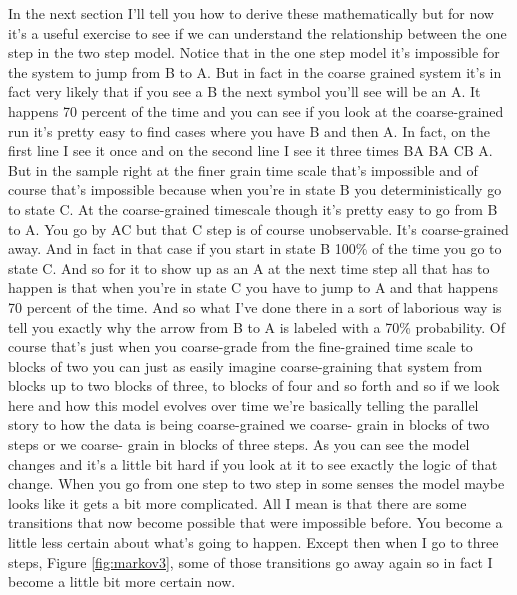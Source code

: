 \documentclass[]{article}
\begin{document}
 In the
next section I'll tell you how to derive
these mathematically but for now it's a
useful exercise to see if we can
understand the relationship between the
one step in the two step model.
Notice that in the one step model it's
impossible for the system to jump from B
to A. But in fact in the coarse grained
system it's in fact very likely that if
you see a B the next symbol you'll see
will be an A. It happens 70 percent of
the time and you can see if you look at
the coarse-grained run it's pretty easy to
find cases where you have B and then A.
In fact, on the first line I see it once
and on the second line I see it three
times BA BA CB A. But in the sample right
at the finer grain time scale that's
impossible and of course that's
impossible because when you're in state B
you deterministically go to state C. At the
coarse-grained timescale though it's
pretty easy to go from B to A. You go by
AC but that C step is of course
unobservable. It's coarse-grained away.
And in fact in that case if you start in
state B 100\% of the time you go to state
C. And so for it to show up as an A at
the next time step all that has to
happen is that when you're in state C
you have to jump to A and that happens 70
percent of the time. And so what I've
done there in a sort of laborious way is
tell you exactly why the arrow from B to
A is labeled with a 70\% probability. Of
course that's just when you coarse-grade
from the fine-grained time scale to
blocks of two you can just as easily
imagine coarse-graining that
system from blocks up to two blocks of
three, to blocks of four and so forth
and so if we look here and how this
model evolves over time we're basically
telling the parallel story to how the
data is being coarse-grained we coarse-
grain in blocks of two steps or we coarse-
grain in blocks of three steps. As you
can see the model changes and it's a
little bit hard if you look at it to see
exactly the logic of that change. When
you go from one step to two step in some
senses the model maybe looks like it
gets a bit more complicated. All I mean
is that there are some transitions that
now become possible that were impossible
before. You become a little less certain
about what's going to happen. Except then
when I go to three steps, Figure \ref{fig:markov3}, some of those
transitions go away again so in fact
I become a little bit more certain
now. 
\end{document}
